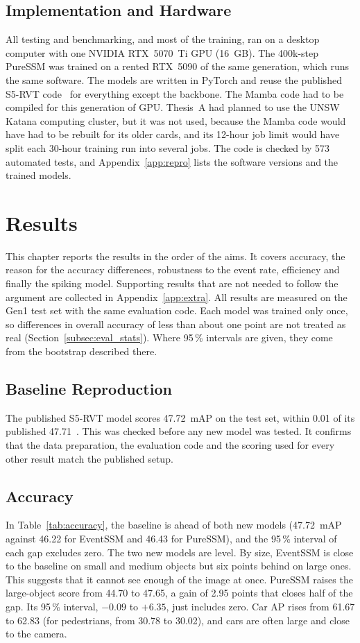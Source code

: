 \documentclass[11pt, a4paper]{report}
\begin{document}
\section{Implementation and Hardware}
\label{sec:implementation}
All testing and benchmarking, and most of the training, ran on a desktop computer with one NVIDIA RTX~5070~Ti
GPU (16~GB). The 400k-step PureSSM was trained on a rented RTX~5090 of the same generation, which
runs the same software. The models are written in PyTorch and reuse the published S5-RVT
code~\cite{zubic2024state} for everything except the backbone. The Mamba code had to be compiled for this
generation of GPU. Thesis~A had planned to use the UNSW Katana computing cluster, but it was not used, because the Mamba code would have had to be rebuilt for its older cards, and its 12-hour job limit would have
split each 30-hour training run into several jobs. The code is checked by 573 automated tests, and
Appendix~\ref{app:repro} lists the software versions and the trained models.

\chapter{Results}
\label{ch:results}
This chapter reports the results in the order of the aims. It covers accuracy, the reason for the accuracy differences, robustness to the event rate, efficiency and finally the spiking model. Supporting results that are not
needed to follow the argument are collected in Appendix~\ref{app:extra}. All results are
measured on the Gen1 test set with the same evaluation code. Each model was trained only once, so
differences in overall accuracy of less than about one point are not treated as real
(Section~\ref{subsec:eval_stats}). Where 95\,\% intervals are given, they come from the bootstrap described
there.

\section{Baseline Reproduction}
\label{sec:repro_results}
The published S5-RVT model scores 47.72~mAP on the test set, within 0.01 of its published
47.71~\cite{zubic2024state}. This was checked before any new model was tested. It confirms that the data
preparation, the evaluation code and the scoring used for every other result match the published setup.

\section{Accuracy}
\label{sec:acc_results}
In Table~\ref{tab:accuracy}, the baseline is ahead of both new models (47.72~mAP against 46.22 for
EventSSM and 46.43 for PureSSM), and the 95\,\% interval of each gap excludes zero. The two new models are level. By size, EventSSM is close to the
baseline on small and medium objects but six points behind on large ones. This suggests that it cannot see
enough of the image at once. PureSSM raises the large-object score from 44.70 to 47.65, a gain of 2.95 points
that closes half of the gap. Its 95\,\% interval, $-0.09$ to $+6.35$, just includes zero. Car AP rises from 61.67 to 62.83 (for pedestrians, from 30.78 to 30.02), and cars are
often large and close to the camera.
\end{document}
